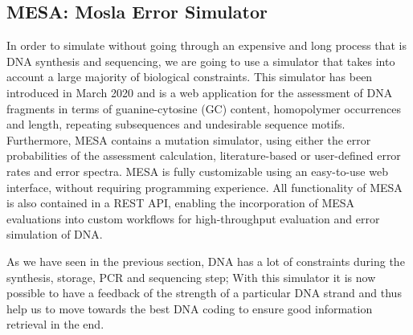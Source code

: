 \subsection{MESA: Mosla Error Simulator}

In order to simulate without going through an expensive and long process that is DNA synthesis and sequencing, we are going to use a simulator that takes into account a large majority of biological constraints.
This simulator has been introduced \cite{bib:10.1093/bioinformatics/btaa140} in March 2020 and is a web application for the assessment of DNA fragments in terms of guanine-cytosine (GC) content, homopolymer occurrences and length, repeating subsequences and undesirable sequence motifs.
Furthermore, MESA contains a mutation simulator, using either the error probabilities of the assessment calculation, literature-based or user-defined error rates and error spectra. MESA is fully customizable using an easy-to-use web interface, without requiring programming experience. All functionality of MESA is also contained in a REST API, enabling the incorporation of MESA evaluations into custom workflows for high-throughput evaluation and error simulation of DNA.

As we have seen in the previous section, DNA has a lot of constraints during the synthesis, storage, PCR and sequencing step; With this simulator it is now possible to have a feedback of the strength of a particular DNA strand and thus help us to move towards the best DNA coding to ensure good information retrieval in the end.

